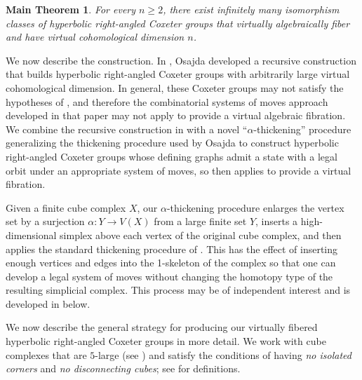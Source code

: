 \documentclass[12pt, letterpaper]{article}
\theoremstyle{plain}
\newtheorem*{mainthm}{Main Theorem}
\theoremstyle{definition}
\begin{document}
\begin{mainthm}\label{thm:main}
    For every $n \geq 2$, there exist infinitely many isomorphism classes of hyperbolic right-angled Coxeter groups that virtually algebraically fiber and have virtual cohomological dimension $n$.
\end{mainthm}

We now describe the construction. In \cite{osajda}, Osajda developed a recursive construction that builds hyperbolic right-angled Coxeter groups with arbitrarily large virtual cohomological dimension. In general, these Coxeter groups may not satisfy the hypotheses of \cite[Thm.\ 6.14]{JNW}, and therefore the combinatorial systems of moves approach developed in that paper may not apply to provide a virtual algebraic fibration. We combine the recursive construction in \cite{osajda} with a novel ``$\alpha$-thickening'' procedure generalizing the thickening procedure used by Osajda to construct hyperbolic right-angled Coxeter groups whose defining graphs admit a state with a legal orbit under an appropriate system of moves, so \cite{JNW} then applies to provide a virtual fibration.

Given a finite cube complex $X$, our $\alpha$-thickening procedure enlarges the vertex set  by a surjection $\alpha \colon Y \to V(X)$ from a large finite set $Y$, inserts a high-dimensional simplex above each vertex of the original cube complex, and then applies the standard thickening procedure of \cite{osajda}. This has the effect of inserting enough vertices and edges into the 1-skeleton of the complex so that one can develop a legal system of moves without changing the homotopy type of the resulting simplicial complex. This process may be of independent interest and is developed in  below.

We now describe the general strategy for producing our virtually fibered hyperbolic right-angled Coxeter groups in more detail. We work with cube complexes that are $5$-large (see ) and satisfy the conditions of having \emph{no isolated corners} and \emph{no disconnecting cubes}; see  for definitions.
\end{document}
